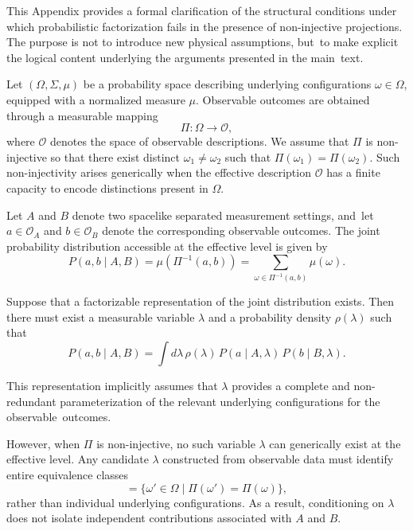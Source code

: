 \documentclass[11pt,a4paper]{article}
\theoremstyle{remark}
\begin{document}
  This Appendix provides a formal clarification of the structural conditions under
  which probabilistic factorization fails in the presence of non-injective projections.
  The purpose is not to introduce new physical assumptions, but~to make explicit the
  logical content underlying the arguments presented in the main~text.

  Let $(\Omega,\Sigma,\mu)$ be a probability space describing underlying configurations
  $\omega \in \Omega$, equipped with a normalized measure $\mu$.
  Observable outcomes are obtained through a measurable mapping
  \begin{equation}
    \Pi : \Omega \rightarrow \mathcal{O},
  \end{equation}
  where $\mathcal{O}$ denotes the space of observable descriptions.
  We assume that $\Pi$ is non-injective so that there exist distinct
  $\omega_1 \neq \omega_2$ such that $\Pi(\omega_1)=\Pi(\omega_2)$.
  Such non-injectivity arises generically when the effective description $\mathcal{O}$
  has a finite capacity to encode distinctions present in $\Omega$.

  Let $A$ and $B$ denote two spacelike separated measurement settings, and~let
  $a \in \mathcal{O}_A$ and $b \in \mathcal{O}_B$ denote the corresponding observable
  outcomes.
  The joint probability distribution accessible at the effective level is given by
\begin{equation}
    P(a,b \mid A,B)
    =
    \mu\!\left(\Pi^{-1}(a,b)\right)
    =
    \sum_{\omega \in \Pi^{-1}(a,b)} \mu(\omega).
  \end{equation}

  Suppose that a factorizable representation of the joint distribution exists.
  Then there must exist a measurable variable $\lambda$ and a probability density
  $\rho(\lambda)$ such that
\begin{equation}
    P(a,b \mid A,B)
    =
    \int d\lambda\,
    \rho(\lambda)\,
    P(a \mid A,\lambda)\,
    P(b \mid B,\lambda).
    \label{eq:bell-factorization}
  \end{equation}

  This representation implicitly assumes that $\lambda$ provides a complete and
  non-redundant parameterization of the relevant underlying configurations for the
  observable~outcomes.

  However, when $\Pi$ is non-injective, no such variable $\lambda$ can generically
  exist at the effective level.
  Any candidate $\lambda$ constructed from observable data must identify entire
  equivalence classes
\begin{equation}
    [\omega] = \{\omega' \in \Omega \mid \Pi(\omega')=\Pi(\omega)\},
  \end{equation}
  rather than individual underlying configurations.
  As a result, conditioning on $\lambda$ does not isolate independent contributions
  associated with $A$ and $B$.
\end{document}
